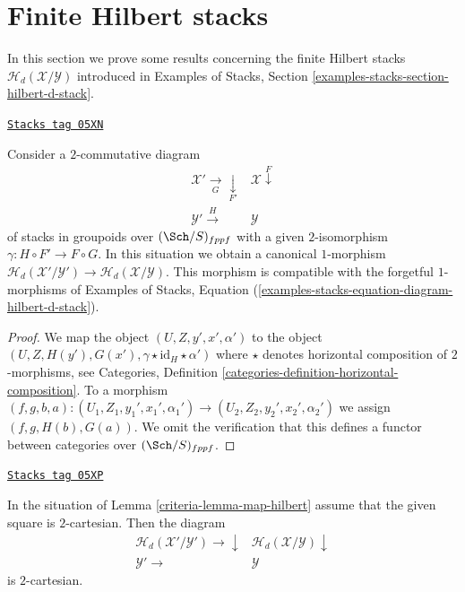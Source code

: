 \section{Finite Hilbert stacks}
\label{criteria-section-finite-hilbert-stacks}
In this section we prove some results concerning the finite
Hilbert stacks $\mathcal{H}_d(\mathcal{X}/\mathcal{Y})$
introduced in
Examples of Stacks, Section \ref{examples-stacks-section-hilbert-d-stack}.

\begin{lemma}
\label{criteria-lemma-map-hilbert}
\href{https://stacks.math.columbia.edu/tag/05XN}{\texttt{Stacks tag 05XN}}

Consider a $2$-commutative diagram
$$
\begin{array}{cc}\mathcal{X}' \underset{G}{\longrightarrow}\underset{F'}{\downarrow} & \mathcal{X} \overset{F}{\downarrow} \\ \mathcal{Y}' \overset{H}{\longrightarrow} & \mathcal{Y}\end{array}
$$
of stacks in groupoids over $(\Sch/S)_{fppf}$ with a given
$2$-isomorphism $\gamma : H \circ F' \to F \circ G$. In this situation we
obtain a canonical $1$-morphism
$\mathcal{H}_d(\mathcal{X}'/\mathcal{Y}') \to
\mathcal{H}_d(\mathcal{X}/\mathcal{Y})$.
This morphism is compatible with the forgetful $1$-morphisms of
Examples of Stacks,
Equation (\ref{examples-stacks-equation-diagram-hilbert-d-stack}).
\end{lemma}

\begin{proof}
We map the object $(U, Z, y', x', \alpha')$ to the object
$(U, Z, H(y'), G(x'), \gamma \star \text{id}_H \star \alpha')$
where $\star$ denotes horizontal composition of $2$-morphisms, see
Categories, Definition \ref{categories-definition-horizontal-composition}.
To a morphism
$(f, g, b, a) :
(U_1, Z_1, y_1', x_1', \alpha_1') \to (U_2, Z_2, y_2', x_2', \alpha_2')$
we assign
$(f, g, H(b), G(a))$.
We omit the verification that this defines a functor between categories over
$(\Sch/S)_{fppf}$.
\end{proof}

\begin{lemma}
\label{criteria-lemma-cartesian-map-hilbert}
\href{https://stacks.math.columbia.edu/tag/05XP}{\texttt{Stacks tag 05XP}}

In the situation of
Lemma \ref{criteria-lemma-map-hilbert}
assume that the given square is $2$-cartesian. Then the diagram
$$
\begin{array}{cc}\mathcal{H}_d(\mathcal{X}'/\mathcal{Y}') \longrightarrow\downarrow & \mathcal{H}_d(\mathcal{X}/\mathcal{Y}) \downarrow \\ \mathcal{Y}' \longrightarrow & \mathcal{Y}\end{array}
$$
is $2$-cartesian.
\end{lemma}

